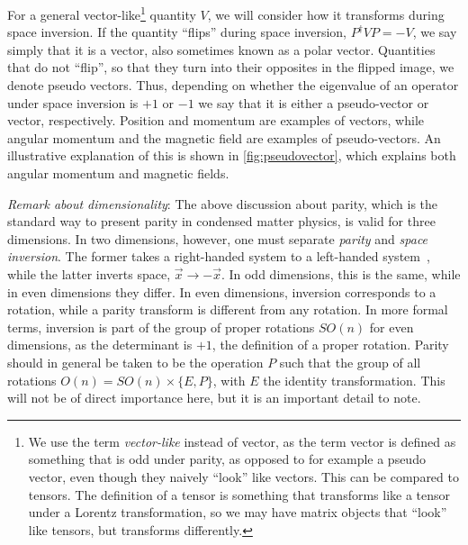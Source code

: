 For a general vector-like\footnote{We use the term \emph{vector-like} instead of vector, as the term vector is defined as something that is odd under parity, as opposed to for example a pseudo vector, even though they naively ``look'' like vectors. This can be compared to tensors. The definition of a tensor is something that transforms like a tensor under a Lorentz transformation, so we may have matrix objects that ``look'' like tensors, but transforms differently.} quantity $V$, we will consider how it transforms during space inversion.
If the quantity ``flips'' during space inversion, $P^\dagger V P = -V$, we say simply that it is a vector, also sometimes known as a polar vector.
Quantities that do not ``flip'', so that they turn into their opposites in the flipped image, we denote pseudo vectors.
Thus, depending on whether the eigenvalue of an operator under space inversion is $+1$ or $-1$ we say that it is either a pseudo-vector or vector, respectively.
Position and momentum are examples of vectors, while angular momentum and the magnetic field are examples of pseudo-vectors.
An illustrative explanation of this is shown in \cref{fig:pseudovector}, which explains both angular momentum and magnetic fields.

\emph{Remark about dimensionality}: The above discussion about parity, which is the standard way to present parity in condensed matter physics, is valid for three dimensions.
In two dimensions, however, one must separate \emph{parity} and \emph{space inversion}.
The former takes a right-handed system to a left-handed system~\cite{sakuraiModernQuantumMechanics2017}, while the latter inverts space, $\vec{x} \to  -\vec{x}$.
In odd dimensions, this is the same, while in even dimensions they differ.
In even dimensions, inversion corresponds to a rotation, while a parity transform is different from any rotation.
In more formal terms, inversion is part of the group of proper rotations $SO(n)$ for even dimensions, as the determinant is $+1$, the definition of a proper rotation.
Parity should in general be taken to be the operation $P$ such that the group of all rotations $O(n) = SO(n) \times \{E, P\}$, with $E$ the identity transformation.
This will not be of direct importance here, but it is an important detail to note.


